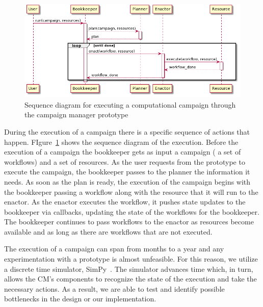 \begin{figure}[t]
    \centering
    \includegraphics[width=.95\textwidth]{figures/manager/rcm_seq.png}
    \caption{Sequence diagram for executing a computational campaign through the campaign manager prototype}
    \label{fig:seq_diag}
\end{figure}

During the execution of a campaign there is a specific sequence of actions that happen.
FIgure~\ref{fig:seq_diag} shows the sequence diagram of the execution.
Before the execution of a campaign the bookkeeper gets as input a campaign ( a set of workflows) and a set of resources.
As the user requests from the prototype to execute the campaign, the bookkeeper passes to the planner the information it needs.
As soon as the plan is ready, the execution of the campaign begins with the bookkeeper passing a workflow along with the resource that it will run to the enactor.
As the enactor executes the workflow, it pushes state updates to the bookkeeper via callbacks, updating the state of the workflows for the bookkeeper.
The bookkeeper continues to pass workflows to the enactor as resources become available and as long as there are workflows that are not executed.

The execution of a campaign can span from months to a year and any experimentation with a prototype is almost unfeasible.
For this reason, we utilize a discrete time simulator, SimPy~\cite{simpy}.
The simulator advances time which, in turn, allows the CM's components to recognize the state of the execution and take the necessary actions.
As a result, we are able to test and identify possible bottlenecks in the design or our implementation.

